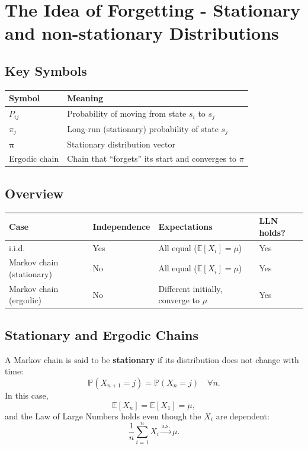 \section{The Idea of Forgetting - Stationary and non-stationary Distributions}

\subsection{Key Symbols}

\begin{center}
\begin{tabular}{ll}
\toprule
\textbf{Symbol} & \textbf{Meaning} \\
\midrule
$P_{ij}$ & Probability of moving from state $s_i$ to $s_j$ \\
$\pi_j$ & Long-run (stationary) probability of state $s_j$ \\
$\boldsymbol{\pi}$ & Stationary distribution vector \\
Ergodic chain & Chain that “forgets” its start and converges to $\pi$ \\
\bottomrule
\end{tabular}
\end{center}

\subsection{Overview}

\begin{center}
\begin{tabular}{@{}llll@{}}
\toprule
\textbf{Case} & \textbf{Independence} & \textbf{Expectations} & \textbf{LLN holds?} \\
\midrule
i.i.d. & Yes & All equal ($\mathbb{E}[X_i] = \mu$) & Yes \\
Markov chain (stationary) & No & All equal ($\mathbb{E}[X_i] = \mu$) & Yes \\
Markov chain (ergodic) & No & Different initially, converge to $\mu$ & Yes \\
\bottomrule
\end{tabular}
\end{center}

\subsection{Stationary and Ergodic Chains}

A Markov chain is said to be \textbf{stationary} if its distribution does not
change with time:
\[
\mathbb{P}(X_{n+1} = j) = \mathbb{P}(X_n = j) \quad \forall n.
\]
In this case,
\[
\mathbb{E}[X_n] = \mathbb{E}[X_1] = \mu,
\]
and the Law of Large Numbers holds even though the $X_i$ are dependent:
\[
\frac{1}{n} \sum_{i=1}^{n} X_i \xrightarrow{\text{a.s.}} \mu.
\]

